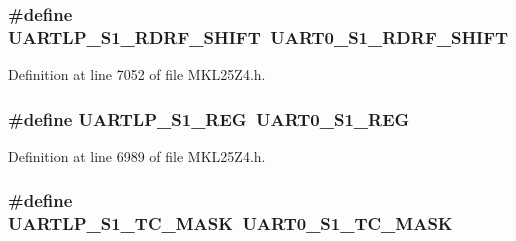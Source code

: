 \subsubsection[{\texorpdfstring{U\+A\+R\+T\+L\+P\+\_\+\+S1\+\_\+\+R\+D\+R\+F\+\_\+\+S\+H\+I\+FT}{UARTLP_S1_RDRF_SHIFT}}]{\setlength{\rightskip}{0pt plus 5cm}\#define U\+A\+R\+T\+L\+P\+\_\+\+S1\+\_\+\+R\+D\+R\+F\+\_\+\+S\+H\+I\+FT~{\bf U\+A\+R\+T0\+\_\+\+S1\+\_\+\+R\+D\+R\+F\+\_\+\+S\+H\+I\+FT}}\hypertarget{group___backward___compatibility___symbols_ga431c49f191f29ccbeade2bd87502531c}{}\label{group___backward___compatibility___symbols_ga431c49f191f29ccbeade2bd87502531c}


Definition at line 7052 of file M\+K\+L25\+Z4.\+h.

\subsubsection[{\texorpdfstring{U\+A\+R\+T\+L\+P\+\_\+\+S1\+\_\+\+R\+EG}{UARTLP_S1_REG}}]{\setlength{\rightskip}{0pt plus 5cm}\#define U\+A\+R\+T\+L\+P\+\_\+\+S1\+\_\+\+R\+EG~{\bf U\+A\+R\+T0\+\_\+\+S1\+\_\+\+R\+EG}}\hypertarget{group___backward___compatibility___symbols_ga4b672ad4da9e7bacc386fcb5e93e7b77}{}\label{group___backward___compatibility___symbols_ga4b672ad4da9e7bacc386fcb5e93e7b77}


Definition at line 6989 of file M\+K\+L25\+Z4.\+h.

\subsubsection[{\texorpdfstring{U\+A\+R\+T\+L\+P\+\_\+\+S1\+\_\+\+T\+C\+\_\+\+M\+A\+SK}{UARTLP_S1_TC_MASK}}]{\setlength{\rightskip}{0pt plus 5cm}\#define U\+A\+R\+T\+L\+P\+\_\+\+S1\+\_\+\+T\+C\+\_\+\+M\+A\+SK~{\bf U\+A\+R\+T0\+\_\+\+S1\+\_\+\+T\+C\+\_\+\+M\+A\+SK}}\hypertarget{group___backward___compatibility___symbols_ga1110069e543f57629a601fabe094b80f}{}\label{group___backward___compatibility___symbols_ga1110069e543f57629a601fabe094b80f}


